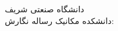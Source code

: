 \thispagestyle{empty}
\begin{center}
\Large{دانشگاه صنعتی شریف} \\
\Large{دانشکده مکانیک}
\vskip 1cm
\large{رساله \falevel}
\vskip 2cm
\textbf{\Large{\fatitle}}
\vskip 2cm
نگارش: \faAuthor
\end{center}
\vskip 4cm
\begin{tabular}{p{11.5cm}p{2cm}}
\end{tabular}

